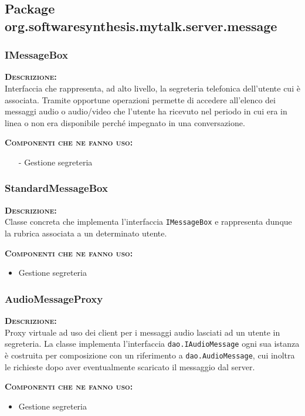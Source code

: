 \subsection{Package org.softwaresynthesis.mytalk.server.message}
\subsubsection{IMessageBox}
\begin{description}
	\item{\scshape\bfseries Descrizione:}\\
Interfaccia che rappresenta, ad alto livello, la segreteria telefonica dell'utente cui è associata. Tramite opportune operazioni permette di accedere all'elenco dei messaggi audio o audio/video che l'utente ha ricevuto nel periodo in cui era in linea o non era disponibile perché impegnato in una conversazione.
	\item{\scshape\bfseries Componenti che ne fanno uso:}
	\begin{itemize}
	  \item[-] Gestione segreteria
	\end{itemize}
\end{description}

\subsubsection{StandardMessageBox}
\begin{description}
	\item{\scshape\bfseries Descrizione:}\\
Classe concreta che implementa l'interfaccia \texttt{IMessageBox} e rappresenta dunque la rubrica associata a un determinato utente.
	\item{\scshape\bfseries Componenti che ne fanno uso:}
	\begin{itemize}[noitemsep,nolistsep]
	  \item Gestione segreteria
	\end{itemize}
\end{description}

\subsubsection{AudioMessageProxy}
\begin{description}
	\item{\scshape\bfseries Descrizione:}\\
Proxy virtuale ad uso dei client per i messaggi audio lasciati ad un utente in segreteria. La classe implementa l'interfaccia \texttt{dao.IAudioMessage} ogni sua istanza è costruita per composizione con un riferimento a  \texttt{dao.AudioMessage}, cui inoltra le richieste dopo aver eventualmente scaricato il messaggio dal server.
	\item{\scshape\bfseries Componenti che ne fanno uso:}
	\begin{itemize}[noitemsep,nolistsep]
	  \item Gestione segreteria
	\end{itemize}
\end{description}

